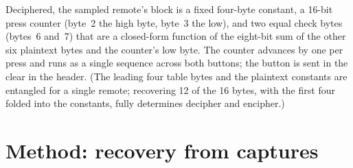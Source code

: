 \documentclass[11pt,a4paper]{article}
\begin{document}
Deciphered, the sampled remote's block is a fixed four-byte constant, a 16-bit press counter (byte~2 the high byte, byte~3 the low), and two equal check bytes (bytes~6 and~7) that are a closed-form function of the eight-bit sum of the other six plaintext bytes and the counter's low byte. The counter advances by one per press and runs as a single sequence across both buttons; the button is sent in the clear in the header. (The leading four table bytes and the plaintext constants are entangled for a single remote; recovering 12 of the 16 bytes, with the first four folded into the constants, fully determines decipher and encipher.)

\section{Method: recovery from captures}
\end{document}
